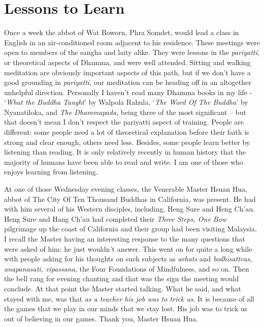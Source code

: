 \chapter{Lessons to Learn}

Once a week the abbot of Wat Boworn, Phra Somdet, would lead a class in
English in an air-conditioned room adjacent to his residence. These
meetings were open to members of the sangha and laity alike. They were
lessons in the \emph{pariyatti}, or theoretical aspects of Dhamma, and
were well attended. Sitting and walking meditation are obviously
important aspects of this path, but if we don't have a good grounding in
\emph{pariyatti,} our meditation can be heading off in an altogether
unhelpful direction. Personally I haven't read many Dhamma books in my
life - `\emph{What the Buddha Taught}' by Walpola Rahula,
`\emph{The Word Of The Buddha}' by Nyanatiloka, and \emph{The Dhammapada}\cite{dhammapada},
being three of the most significant -- but that
doesn't mean I don't respect the pariyatti aspect of training. People
are different: some people need a lot of theoretical explanation before
their faith is strong and clear enough, others need less. Besides, some
people learn better by listening than reading. It is only relatively
recently in human history that the majority of humans have been able to
read and write. I am one of those who enjoys learning from listening.

At one of those Wednesday evening classes, the Venerable Master Hsuan
Hua, abbot of The City Of Ten Thousand Buddhas in California, was
present. He had with him several of his Western disciples, including,
Heng Sure and Heng Ch'au. Heng Sure and Hang Ch'au had completed their
\emph{Three Steps, One Bow}\cite{steps} pilgrimage up the coast of California and
their group had been visiting Malaysia. I recall the Master having an
interesting response to the many questions that were asked of him: he
just wouldn't answer. This went on for quite a long while with people
asking for his thoughts on such subjects as \emph{arhats} and
\emph{bodhisattvas}, \emph{anapanasati, vipassana}, the Four Foundations
of Mindfulness, and so on. Then the bell rang for evening chanting and
that was the sign the meeting would conclude. At that point the Master
started talking. What he said, and what stayed with me, was that
\emph{as a teacher his job was to trick us}. It is because of all the
games that we play in our minds that we stay lost. His job was to trick
us out of believing in our games. Thank you, Master Hsuan Hua.

